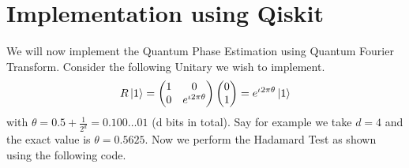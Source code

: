 \section{Implementation using Qiskit}
We will now implement the Quantum Phase Estimation using Quantum Fourier Transform. Consider the following Unitary we wish to implement.
\[
R\ket{1}=\begin{pmatrix} 1 & 0 \\ 0 & e^{\iota 2 \pi \theta}\end{pmatrix} \begin{pmatrix} 0 \\ 1 \end{pmatrix} =e^{\iota 2 \pi\theta} \ket{1}
\]
with $\theta = 0.5 +\frac{1}{2^d} = 0.100\ldots 01$ (d bits in total). Say for example we take $d=4$ and the exact value is $\theta=0.5625$. Now we perform the Hadamard Test as shown using the following code.






\chapterreferences
